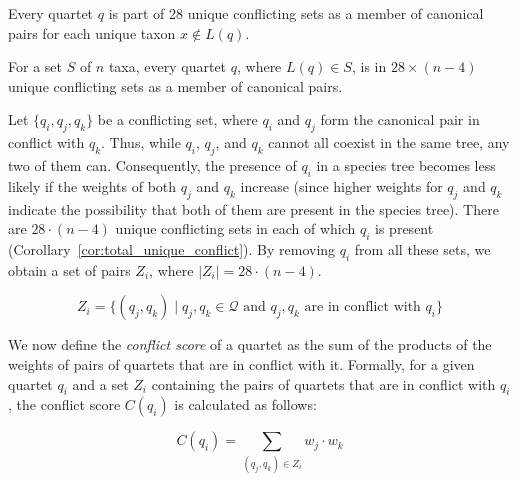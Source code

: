 \documentclass[runningheads]{llncs}
\begin{document}
\vspace{-15pt}

\begin{corollary}
\label{cor:unique-conflict}
Every quartet $q$ is part of 28 unique conflicting sets as a member of canonical pairs for each unique taxon $x \notin L(q) $.
\end{corollary}


\vspace{-15pt}

\begin{corollary}
\label{cor:total_unique_conflict}
For a set $S$ of $n$ taxa, every quartet $q$, where $L(q) \in S$, is in $28 \times (n-4)$ unique conflicting sets as a member of canonical pairs.
\end{corollary}

\vspace{-8pt}

Let $ \{q_i, q_j, q_k \} $ be a conflicting set, where $q_i$ and $q_j$ form the canonical pair in conflict with $q_k$. Thus, while $q_i$, $q_j$, and $q_k$ cannot all coexist in the same tree, any two of them can. Consequently, the presence of $q_i$ in a species tree becomes less likely if the weights of both $q_j$ and $q_k$ increase (since higher weights for $q_j$ and $q_k$ indicate the possibility that both of them are present in the species tree). There are $28 \cdot (n - 4)$ unique conflicting sets in each of which $q_i$ is present (Corollary~\ref{cor:total_unique_conflict}). By removing  $q_i$ from all these sets, we obtain a set of pairs $Z_i$, where $|Z_i| = 28 \cdot (n-4)$. %


$$
Z_i = \{(q_j, q_k) \mid q_j, q_k \in \mathcal{Q} \text{ and } q_j, q_k \text{ are in conflict with } q_i\}
$$

We now define the \textit{conflict score} of a quartet as the sum of the products of the weights of pairs of quartets that are in conflict with it. Formally, for a given quartet $q_i$ and a set $Z_i$ containing the pairs of quartets that are in conflict with $q_i$, the conflict score $C(q_i)$ is calculated as follows:

\vspace{-10pt}
\begin{equation}
\label{eq:conflict_score}
C(q_i) = \sum_{(q_j, q_k) \in Z_i} w_j \cdot w_k
\end{equation}
\end{document}
